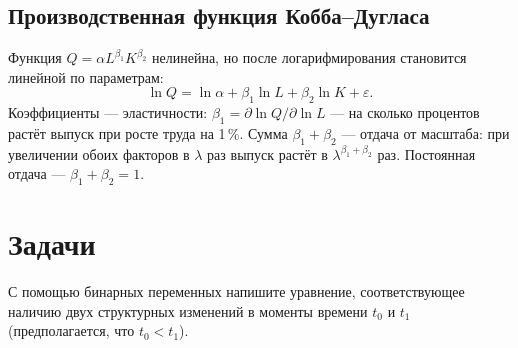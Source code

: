 \subsection{Производственная функция Кобба--Дугласа}\label{sec:cd}

Функция $Q = \alpha L^{\beta_1}K^{\beta_2}$ нелинейна, но после
логарифмирования становится линейной по параметрам:
\begin{equation}
  \ln Q = \ln\alpha + \beta_1\ln L + \beta_2\ln K + \varepsilon .
  \label{eq:cd}
\end{equation}
Коэффициенты — эластичности: $\beta_1 = \partial\ln Q/\partial\ln L$ —
на сколько процентов растёт выпуск при росте труда на 1\,\%. Сумма
$\beta_1 + \beta_2$ — отдача от масштаба: при увеличении обоих факторов в
$\lambda$ раз выпуск растёт в $\lambda^{\beta_1+\beta_2}$ раз. Постоянная отдача
— $\beta_1 + \beta_2 = 1$.
\fi

\section{Задачи}


С помощью бинарных переменных напишите уравнение, соответствующее наличию
двух структурных изменений в моменты времени $t_0$ и $t_1$ (предполагается, что
$t_0 < t_1$).

